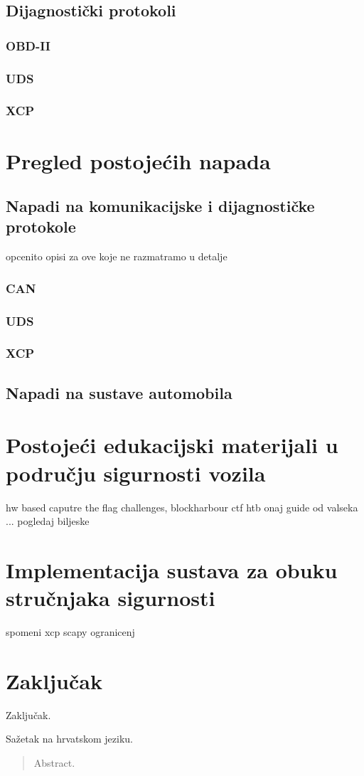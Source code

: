\documentclass[times, utf8, diplomski, numeric]{fer}
\begin{document}
\section{Dijagnostički protokoli}
\subsection{OBD-II}
\subsection{UDS}
\subsection{XCP}

\chapter{Pregled postojećih napada}
\section{Napadi na komunikacijske i dijagnostičke protokole}
opcenito opisi za ove koje ne razmatramo u detalje
\subsection{CAN}
\subsection{UDS}
\subsection{XCP}
\section{Napadi na sustave automobila}
\chapter{Postojeći edukacijski materijali u području sigurnosti vozila}
hw based caputre the flag challenges,
blockharbour ctf
htb
onaj guide od valseka
... pogledaj biljeske
\chapter{Implementacija sustava za obuku stručnjaka sigurnosti}

spomeni xcp scapy ogranicenj
\chapter{Zaključak}
 Zaključak.





\begin{sazetak}
Sažetak na hrvatskom jeziku.

\end{sazetak}

\begin{abstract}
Abstract.

\end{abstract}
\end{document}
